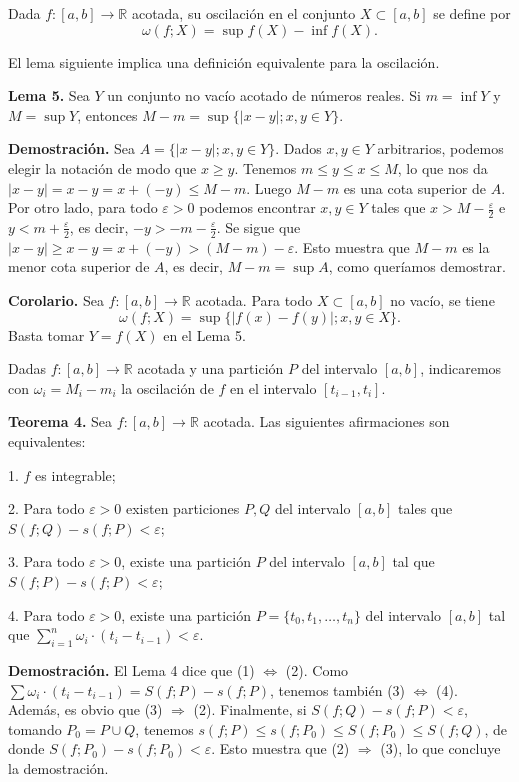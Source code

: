 \documentclass[12pt,oneside]{book}
\begin{document}
Dada \(f: [a, b] \to \mathbb{R}\) acotada, su oscilación en el conjunto \(X \subset [a, b]\) se define por
\[
\omega(f; X) = \sup f(X) - \inf f(X).
\]

El lema siguiente implica una definición equivalente para la oscilación.

\textbf{Lema 5.} Sea \(Y\) un conjunto no vacío acotado de números reales. Si \(m = \inf Y\) y \(M = \sup Y\), entonces \(M - m = \sup\{|x - y|; x, y \in Y\}\).

\textbf{Demostración.} Sea \(A = \{|x - y|; x, y \in Y\}\). Dados \(x, y \in Y\) arbitrarios, podemos elegir la notación de modo que \(x \geq y\). Tenemos \(m \leq y \leq x \leq M\), lo que nos da \(|x - y| = x - y = x + (-y) \leq M - m\). Luego \(M - m\) es una cota superior de \(A\). Por otro lado, para todo \(\varepsilon > 0\) podemos encontrar \(x, y \in Y\) tales que \(x > M - \frac{\varepsilon}{2}\) e \(y < m + \frac{\varepsilon}{2}\), es decir, \(-y > -m - \frac{\varepsilon}{2}\). Se sigue que \(|x - y| \geq x - y = x + (-y) > (M - m) - \varepsilon\). Esto muestra que \(M - m\) es la menor cota superior de \(A\), es decir, \(M - m = \sup A\), como queríamos demostrar.

\textbf{Corolario.} Sea \(f: [a, b] \to \mathbb{R}\) acotada. Para todo \(X \subset [a, b]\) no vacío, se tiene
\[
\omega(f; X) = \sup\{|f(x) - f(y)|; x, y \in X\}.
\]
Basta tomar \(Y = f(X)\) en el Lema 5.

Dadas \(f: [a, b] \to \mathbb{R}\) acotada y una partición \(P\) del intervalo \([a, b]\), indicaremos con \(\omega_i = M_i - m_i\) la oscilación de \(f\) en el intervalo \([t_{i-1}, t_i]\).

\textbf{Teorema 4.} Sea \(f: [a, b] \to \mathbb{R}\) acotada. Las siguientes afirmaciones son equivalentes:

1. \(f\) es integrable;

2. Para todo \(\varepsilon > 0\) existen particiones \(P, Q\) del intervalo \([a, b]\) tales que \(S(f; Q) - s(f; P) < \varepsilon\);

3. Para todo \(\varepsilon > 0\), existe una partición \(P\) del intervalo \([a, b]\) tal que \(S(f; P) - s(f; P) < \varepsilon\);

4. Para todo \(\varepsilon > 0\), existe una partición \(P = \{t_0, t_1, \ldots, t_n\}\) del intervalo \([a, b]\) tal que \(\sum_{i=1}^n \omega_i \cdot (t_i - t_{i-1}) < \varepsilon\).

\textbf{Demostración.} El Lema 4 dice que (1) \(\Leftrightarrow\) (2). Como \(\sum \omega_i \cdot (t_i - t_{i-1}) = S(f; P) - s(f; P)\), tenemos también (3) \(\Leftrightarrow\) (4). Además, es obvio que (3) \(\Rightarrow\) (2). Finalmente, si \(S(f; Q) - s(f; P) < \varepsilon\), tomando \(P_0 = P \cup Q\), tenemos \(s(f; P) \leq s(f; P_0) \leq S(f; P_0) \leq S(f; Q)\), de donde \(S(f; P_0) - s(f; P_0) < \varepsilon\). Esto muestra que (2) \(\Rightarrow\) (3), lo que concluye la demostración.
\end{document}

